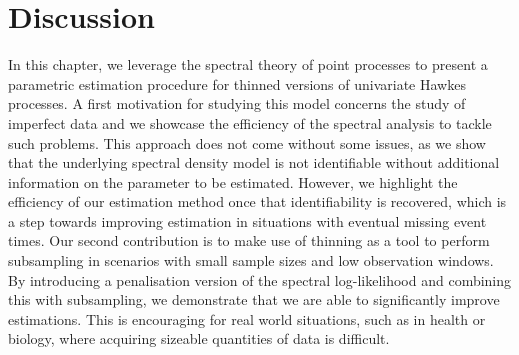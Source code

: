 

\section{Discussion}
    In this chapter, we leverage the spectral theory of point processes to present a parametric estimation procedure for thinned versions of univariate Hawkes processes.
    A first motivation for studying this model concerns the study of imperfect data and we showcase the efficiency of the spectral analysis to tackle such problems.
    This approach does not come without some issues, as we show that the underlying spectral density model is not identifiable without additional information on the parameter to be estimated.
    However, we highlight the efficiency of our estimation method once that identifiability is recovered, which is a step towards improving estimation in situations with eventual missing event times.
    Our second contribution is to make use of thinning as a tool to perform subsampling in scenarios with small sample sizes and low observation windows. 
    By introducing a penalisation version of the spectral log-likelihood and combining this with subsampling, we demonstrate that we are able to significantly improve estimations. 
    This is encouraging for real world situations, such as in health or biology, where acquiring sizeable quantities of data is difficult.

